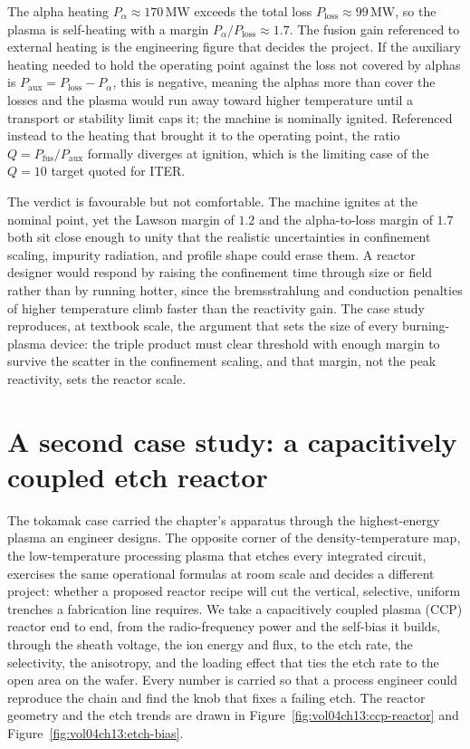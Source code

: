 The alpha heating $P_\alpha \approx 170\,\si{\mega\watt}$ exceeds the total
loss $P_{\mathrm{loss}} \approx 99\,\si{\mega\watt}$, so the plasma is
self-heating with a margin $P_\alpha/P_{\mathrm{loss}} \approx 1.7$. The
fusion gain referenced to external heating is the engineering figure that
decides the project. If the auxiliary heating needed to hold the operating
point against the loss not covered by alphas is $P_{\mathrm{aux}} =
P_{\mathrm{loss}} - P_\alpha$, this is negative, meaning the alphas more
than cover the losses and the plasma would run away toward higher
temperature until a transport or stability limit caps it; the machine is
nominally ignited. Referenced instead to the heating that brought it to the
operating point, the ratio $Q = P_{\mathrm{fus}}/P_{\mathrm{aux}}$ formally
diverges at ignition, which is the limiting case of the $Q = 10$ target
quoted for ITER.

The verdict is favourable but not comfortable. The machine ignites at the
nominal point, yet the Lawson margin of $1.2$ and the alpha-to-loss margin
of $1.7$ both sit close enough to unity that the realistic uncertainties in
confinement scaling, impurity radiation, and profile shape could erase
them. A reactor designer would respond by raising the confinement time
through size or field rather than by running hotter, since the
bremsstrahlung and conduction penalties of higher temperature climb faster
than the reactivity gain. The case study reproduces, at textbook scale, the
argument that sets the size of every burning-plasma device: the triple
product must clear threshold with enough margin to survive the scatter in
the confinement scaling, and that margin, not the peak reactivity, sets the
reactor scale.

\section{A second case study: a capacitively coupled etch reactor}

The tokamak case carried the chapter's apparatus through the
highest-energy plasma an engineer designs. The opposite corner of the
density-temperature map, the low-temperature processing plasma that etches
every integrated circuit, exercises the same operational formulas at room
scale and decides a different project: whether a proposed reactor recipe
will cut the vertical, selective, uniform trenches a fabrication line
requires. We take a capacitively coupled plasma (CCP) reactor end to end,
from the radio-frequency power and the self-bias it builds, through the
sheath voltage, the ion energy and flux, to the etch rate, the selectivity,
the anisotropy, and the loading effect that ties the etch rate to the open
area on the wafer. Every number is carried so that a process engineer could
reproduce the chain and find the knob that fixes a failing etch. The
reactor geometry and the etch trends are drawn in
Figure~\ref{fig:vol04ch13:ccp-reactor} and
Figure~\ref{fig:vol04ch13:etch-bias}.

